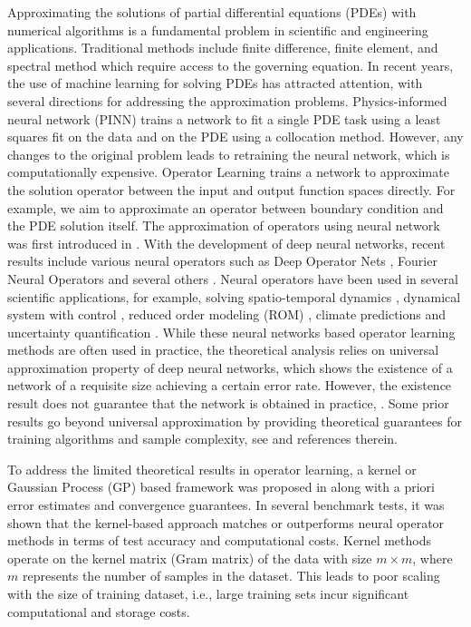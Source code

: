 \documentclass[11pt,twoside]{article}
\theoremstyle{plain}
\theoremstyle{definition}
\theoremstyle{remark}
\begin{document}
Approximating the solutions of partial differential equations (PDEs) with numerical algorithms is a fundamental problem in scientific and engineering applications. 
Traditional methods include finite difference, finite element, and spectral method which require access to the governing equation.
In recent years, the use of machine learning for solving PDEs has attracted attention, with several directions for addressing the approximation problems. 
Physics-informed neural network (PINN) \cite{Raissi2019PINN} trains a network to fit a single PDE task using a least squares fit on the data and on the PDE using a collocation method. However, any changes to the original problem leads to retraining the neural network, which is computationally expensive. 
Operator Learning trains a network to approximate the solution operator between the input and output function spaces directly. 
For example, we aim to approximate an operator between boundary condition and the PDE solution itself. The approximation of operators using neural network was first introduced in \cite{universal1995Chen}.
With the development of deep neural networks, recent results include various neural operators such as Deep Operator Nets \cite{DeepONet2021Lu}, Fourier Neural Operators \cite{Li2020FourierNO} and several others \cite{BelNet2023Zhang, Reduced2022Qian}. 
Neural operators have been used in several scientific applications, for example, solving spatio-temporal dynamics \cite{DeepONet2021Lu, wang2021DeepONet,Mao2023PPDONet,ZHU2023Neural}, dynamical system with control \cite{universal1995Chen}, reduced order modeling (ROM) \cite{LUCIA2004ROM}, climate predictions \cite{kurth2023climate} and uncertainty quantification \cite{YANG2022uncertainty}. 
While these neural networks based operator learning methods are often used in practice, the theoretical analysis relies on universal approximation property of deep neural networks, which shows the existence of a network of a requisite size achieving a certain error rate. However, the existence result does not guarantee that the network is obtained in practice, \cite{universal1995Chen, DENG2022approximation, kovachki2021approximation}. 
 Some prior results go beyond universal approximation by providing theoretical guarantees for training algorithms and sample complexity, see \cite{adcock2022adeep, Liu2024deep, Nicola2025practical,Liu2025generalization} and references therein.

To address the limited theoretical results in operator learning, a kernel or Gaussian Process (GP) based framework was proposed in \cite{BATLLE2024kernel, mora2024OLGP} along with a priori error estimates and convergence guarantees.  
In several benchmark tests, it was shown that the kernel-based approach matches or outperforms neural operator methods in terms of test accuracy and computational costs. 
Kernel methods operate on the kernel matrix (Gram matrix) of the data with size $m\times m$, where $m$ represents the number of samples in the dataset. This leads to poor scaling with the size of training dataset, i.e., large training sets incur significant computational and storage costs.
\end{document}
